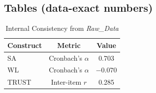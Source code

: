 \documentclass[conference]{IEEEtran}
\begin{document}
\subsection{Tables (data-exact numbers)}
\begin{table}[h]
\centering
\caption{Internal Consistency from \textit{Raw\_Data}}
\begin{tabular}{lcc}
\toprule
Construct & Metric & Value \\
\midrule
SA    & Cronbach's $\alpha$ & 0.703 \\
WL    & Cronbach's $\alpha$ & $-0.070$ \\
TRUST & Inter-item $r$      & 0.285 \\
\bottomrule
\end{tabular}
\end{table}
\end{document}
